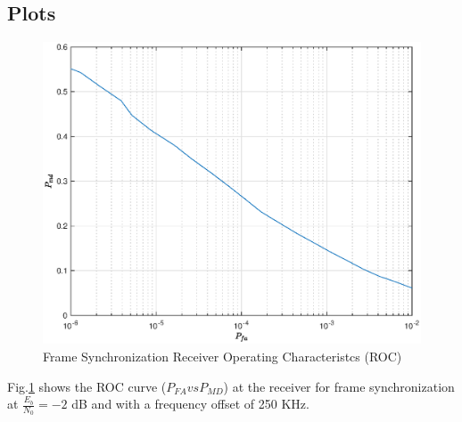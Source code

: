 \subsection{Plots}
\begin{figure}[!t]
\begin{center}
\includegraphics[width=\columnwidth]{./figs/ROC.eps}
\end{center}
\caption{Frame Synchronization Receiver Operating Characteristcs (ROC)}
\label{fig:frameoff}
\end{figure}
Fig.\ref{fig:frameoff} shows the ROC curve ($P_{FA} vs P_{MD}$)  at the receiver for frame synchronization at $\frac{E_b}{N_0}=-2$ dB and with a frequency offset of 250 KHz.

